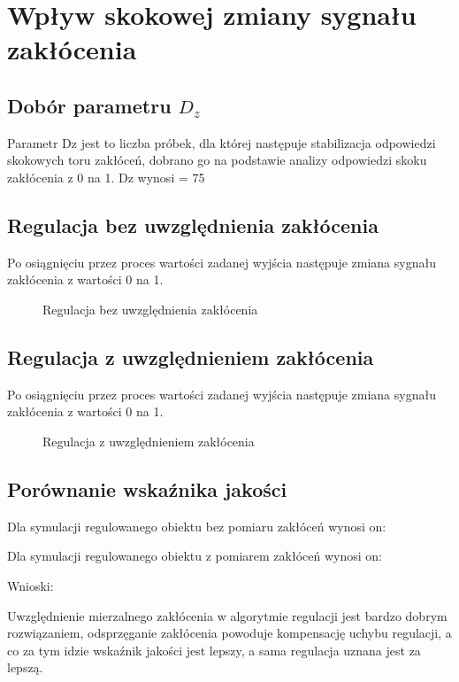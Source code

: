 \section{Wpływ skokowej zmiany sygnału zakłócenia}
\label{projekt:zad5}

\subsection{Dobór parametru $D_z$}
\label{projekt:zad5:Dz}

Parametr Dz jest to liczba próbek, dla której następuje stabilizacja odpowiedzi skokowych toru zakłóceń, 
dobrano go na podstawie analizy odpowiedzi skoku
zakłócenia z 0 na 1.
Dz wynosi = 75

\subsection{Regulacja bez uwzględnienia zakłócenia}
\label{projekt:zad5:regulacjaBezUwzg}

Po osiągnięciu przez proces wartości zadanej wyjścia następuje zmiana sygnału
zakłócenia z wartości 0 na 1.

\begin{figure}[H] 
    \centering
    
    \caption{Regulacja bez uwzględnienia zakłócenia}
    \label{projekt:zad5:regulacjaBezUwzgZ:figure}
\end{figure}

\subsection{Regulacja z uwzględnieniem zakłócenia}
\label{projekt:zad5:regulacjaZUwzg}

Po osiągnięciu przez proces wartości zadanej wyjścia następuje zmiana sygnału
zakłócenia z wartości 0 na 1.

\begin{figure}[H] 
    \centering
    
    \caption{Regulacja z uwzględnieniem zakłócenia}
    \label{projekt:zad5:regulacjaUwzgZ:figure}
\end{figure}

\subsection{Porównanie wskaźnika jakości}
\label{projekt:zad5:porownanie}

Dla symulacji regulowanego obiektu bez pomiaru zakłóceń wynosi on:

Dla symulacji regulowanego obiektu z pomiarem zakłóceń wynosi on:

Wnioski: 

Uwzględnienie mierzalnego zakłócenia w algorytmie regulacji jest bardzo dobrym rozwiązaniem, 
odsprzęganie zakłócenia powoduje kompensację uchybu regulacji, 
a co za tym idzie wskaźnik jakości jest lepszy, 
a sama regulacja uznana jest za lepszą.

